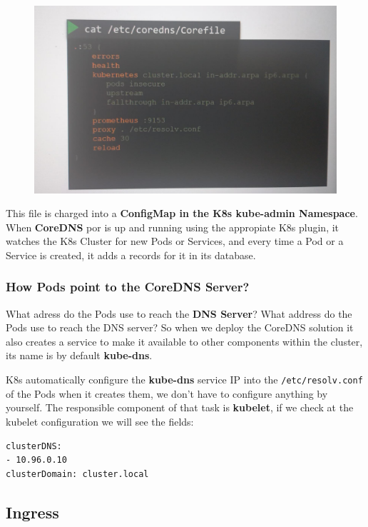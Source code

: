 \documentclass{article}
\newenvironment{codetemplate}[1][]{%
  \mybasecolorbox[#1]
  \itshape
}{%
  \endmybasecolorbox
}
\begin{document}
\begin{figure}[H]
    \centering
    \includegraphics[scale=0.2]{pictures/ingress3.png}
\end{figure}

This file is charged into a \textbf{ConfigMap in the K8s kube-admin Namespace}. When \textbf{CoreDNS} por is up and running using the appropiate K8s plugin, 
it watches the K8s Cluster for new Pods or Services, and every time a Pod or a Service is created, 
it adds a records for it in its database.

\subsubsection{How Pods point to the CoreDNS Server?}

What adress do the Pods use to reach the \textbf{DNS Server}?
What address do the Pods use to reach the DNS server? So when we deploy the CoreDNS solution it
also creates a service to make it available to other components within the cluster,
its name is by default \textbf{kube-dns}.

K8s automatically configure the \textbf{kube-dns} service IP into the \verb|/etc/resolv.conf| of the Pods when it creates them, we don't
have to configure anything by yourself. The responsible component of that task is \textbf{kubelet},
if we check at the kubelet configuration we will see the fields:

\begin{codetemplate}{}
\begin{verbatim}
clusterDNS:
- 10.96.0.10
clusterDomain: cluster.local
\end{verbatim}
\end{codetemplate}

\subsection{Ingress}
\end{document}
